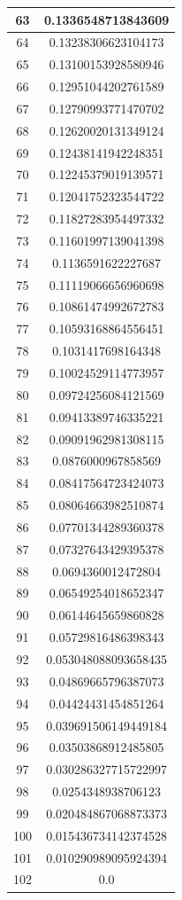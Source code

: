 \documentclass{article}
\begin{document}
\begin{longtable}{|c|c|}
    \hline
    63 & 0.1336548713843609 \\
    \hline
    64 & 0.13238306623104173 \\
    \hline
    65 & 0.13100153928580946 \\
    \hline
    66 & 0.12951044202761589 \\
    \hline
    67 & 0.12790993771470702 \\
    \hline
    68 & 0.12620020131349124 \\
    \hline
    69 & 0.12438141942248351 \\
    \hline
    70 & 0.12245379019139571 \\
    \hline
    71 & 0.12041752323544722 \\
    \hline
    72 & 0.11827283954497332 \\
    \hline
    73 & 0.11601997139041398 \\
    \hline
    74 & 0.1136591622227687 \\
    \hline
    75 & 0.11119066656960698 \\
    \hline
    76 & 0.10861474992672783 \\
    \hline
    77 & 0.10593168864556451 \\
    \hline
    78 & 0.1031417698164348 \\
    \hline
    79 & 0.10024529114773957 \\
    \hline
    80 & 0.09724256084121569 \\
    \hline
    81 & 0.09413389746335221 \\
    \hline
    82 & 0.09091962981308115 \\
    \hline
    83 & 0.0876000967858569 \\
    \hline
    84 & 0.08417564723424073 \\
    \hline
    85 & 0.08064663982510874 \\
    \hline
    86 & 0.07701344289360378 \\
    \hline
    87 & 0.07327643429395378 \\
    \hline
    88 & 0.0694360012472804 \\
    \hline
    89 & 0.06549254018652347 \\
    \hline
    90 & 0.06144645659860828 \\
    \hline
    91 & 0.05729816486398343 \\
    \hline
    92 & 0.053048088093658435 \\
    \hline
    93 & 0.04869665796387073 \\
    \hline
    94 & 0.04424431454851264 \\
    \hline
    95 & 0.039691506149449184 \\
    \hline
    96 & 0.03503868912485805 \\
    \hline
    97 & 0.030286327715722997 \\
    \hline
    98 & 0.0254348938706123 \\
    \hline
    99 & 0.020484867068873373 \\
    \hline
    100 & 0.015436734142374528 \\
    \hline
    101 & 0.010290989095924394 \\
    \hline
    102 & 0.0 \\
    \hline
\end{longtable}
\end{document}
